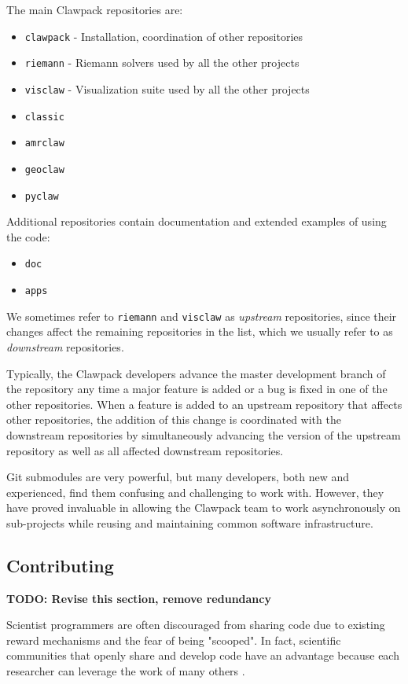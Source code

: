 The main Clawpack repositories are:
\begin{itemize}
    \item \texttt{clawpack} - Installation, coordination of other repositories
    \item \texttt{riemann} - Riemann solvers used by all the other projects
    \item \texttt{visclaw} - Visualization suite used by all the other projects
    \item \texttt{classic}
    \item \texttt{amrclaw}
    \item \texttt{geoclaw}
    \item \texttt{pyclaw}
\end{itemize}

Additional repositories contain documentation and extended examples of
using the code: 
\begin{itemize}
    \item \texttt{doc}
    \item \texttt{apps}
\end{itemize}

We sometimes refer to \texttt{riemann} and \texttt{visclaw} as
\textit{upstream} repositories, since their changes affect the
remaining repositories in the list, which we usually refer to as
\textit{downstream} repositories.

Typically, the Clawpack developers advance the master development
branch of the repository any time a major feature is added or a bug is
fixed in one of the other repositories.  When a feature is added to an
upstream repository that affects other repositories, the addition of
this change is coordinated with the downstream repositories by
simultaneously advancing the version of the upstream repository as
well as all affected downstream repositories.  

Git submodules are very powerful, but many developers, both new and
experienced, find them confusing and challenging to work with.
However, they have proved invaluable in allowing the Clawpack team to
work asynchronously on sub-projects while reusing and maintaining
common software infrastructure.

\subsection{Contributing}

\textbf{TODO: Revise this section, remove redundancy}

Scientist programmers are often discouraged from sharing code
due to existing reward mechanisms and the fear of being "scooped".
In fact, scientific communities that openly share and develop code
have an advantage because each researcher can leverage the work of
many others \cite{turk2013scaling}.


